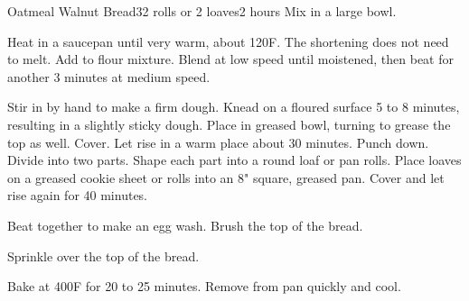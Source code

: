 \documentclass[../Cookbook.tex]{subfiles}
\begin{document}
\begin{recipe}[OatmealWalnutBread]{Oatmeal Walnut Bread}{32 rolls or 2 loaves}{2 hours}
    Mix in a large bowl.

    Heat in a saucepan until very warm, about 120\0F. The shortening does not need to melt.
    Add to flour mixture. Blend at low speed until moistened, then beat for another 3 minutes at medium speed.

    Stir in by hand to make a firm dough.
    Knead on a floured surface 5 to 8 minutes, resulting in a slightly sticky dough.
    Place in greased bowl, turning to grease the top as well.
    Cover. Let rise in a warm place about 30 minutes. Punch down.
    Divide into two parts. Shape each part into a round loaf or pan rolls.
    Place loaves on a greased cookie sheet or rolls into an 8" square, greased pan.
    Cover and let rise again for 40 minutes.

    Beat together to make an egg wash. Brush the top of the bread.

    Sprinkle over the top of the bread.

    Bake at 400\0F for 20 to 25 minutes. Remove from pan quickly and cool.
\end{recipe}
\end{document}
